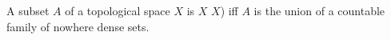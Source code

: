 \begin{definition}
A subset $A$ of a topological space $X$ is  $X$  $X$) iff $A$ is the union of a countable family of nowhere dense sets.
\end{definition}
